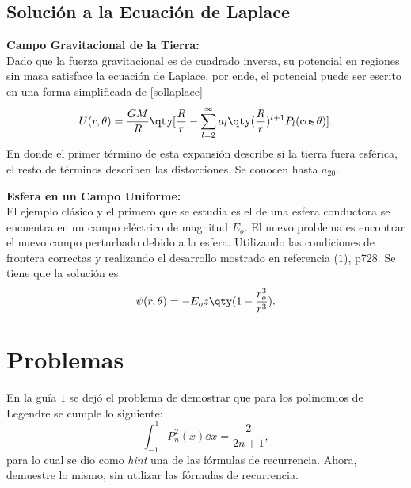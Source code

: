 \subsection*{Solución a la Ecuación de Laplace}


\begin{mdframed}[style=warning]
	{\Large \textbf{Campo Gravitacional de la Tierra:}} \\
	Dado que la fuerza gravitacional es de cuadrado inversa, su potencial en regiones sin masa satisface la ecuación de Laplace, por ende, el potencial puede ser escrito en una forma simplificada de \eqref{sollaplace}
		$$ U(r,\theta) = \frac{GM}{R} \qty[\frac{R}{r} - \sum _{l = 2} ^\infty a_l \qty(\frac{R}{r})^{l + 1} P_l (\cos{\theta})]. $$
	En donde el primer término de esta expansión describe si la tierra fuera esférica, el resto de términos describen las distorciones. Se conocen hasta $a_{20}$.
\end{mdframed}



\begin{mdframed}[style=warning]
	{\Large \textbf{Esfera en un Campo Uniforme:}} \\
	El ejemplo clásico y el primero que se estudia es el de una esfera conductora se encuentra en un campo eléctrico de magnitud $E_o$. El nuevo problema es encontrar el nuevo campo perturbado debido a la esfera. Utilizando las condiciones de frontera correctas y realizando el desarrollo mostrado en referencia ($1$), p728. Se tiene que la solución es
		$$ \psi (r, \theta) = -E_o z \qty(1 - \frac{r_o ^3}{r^3}). $$
\end{mdframed}










\pagebreak


\section*{Problemas}



\begin{ejercicio}
	En la guía $1$ se dejó el problema de demostrar que para los polinomios de Legendre se cumple lo siguiente:
		$$ \int _{-1} ^1 P_n ^2 (x) \dd{x} = \frac{2}{2n + 1}, $$
	para lo cual se dio como \textit{hint} una de las fórmulas de recurrencia. Ahora, demuestre lo mismo, sin utilizar las fórmulas de recurrencia.
\end{ejercicio}


